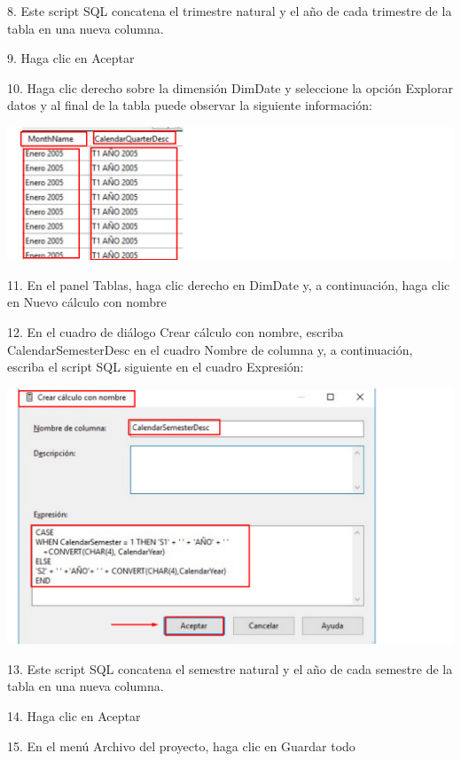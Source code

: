 8. Este script SQL concatena el trimestre natural y el año de cada trimestre de la tabla en una nueva columna.

9. Haga clic en Aceptar

10. Haga clic derecho sobre la dimensión DimDate y seleccione la opción Explorar datos y al final de la tabla puede
observar la siguiente información:

	\begin{center}
	\includegraphics[width=\columnwidth]{images/task6/img3}
	\end{center}	

11. En el panel Tablas, haga clic derecho en DimDate y, a continuación, haga clic en Nuevo cálculo con nombre

12. En el cuadro de diálogo Crear cálculo con nombre, escriba CalendarSemesterDesc en el cuadro Nombre de
columna y, a continuación, escriba el script SQL siguiente en el cuadro Expresión:

	\begin{center}
	\includegraphics[width=\columnwidth]{images/task6/img4}
	\end{center}	

13. Este script SQL concatena el semestre natural y el año de cada semestre de la tabla en una nueva columna.

14. Haga clic en Aceptar

15. En el menú Archivo del proyecto, haga clic en Guardar todo

